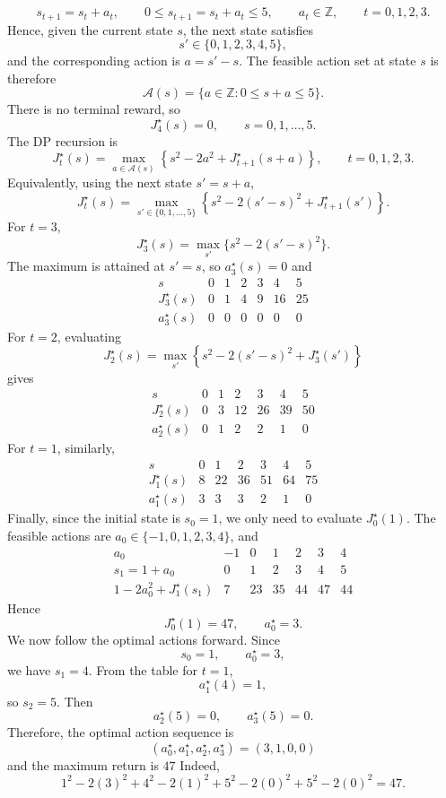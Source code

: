 \documentclass{article}
\begin{document}
\section{}
\[s_{t+1}=s_t+a_t, \qquad
0\leq s_{t+1}=s_t+a_t\leq 5, \qquad
a_t\in\mathbb Z, \qquad t=0,1,2,3.\]
Hence, given the current state $s$, the next state satisfies
\[s'\in\{0,1,2,3,4,5\},\]
and the corresponding action is $a=s'-s$. The feasible action set at state
$s$ is therefore
\[\mathcal A(s)=\{a\in\mathbb Z:0\leq s+a\leq 5\}.\]
There is no terminal reward, so
\[J_4^\star(s)=0, \qquad s=0,1,\ldots,5.\]
The DP recursion is
\[J_t^\star(s)=
\max_{a\in\mathcal A(s)}
\left\{
s^2-2a^2+J_{t+1}^\star(s+a)
\right\},
\qquad t=0,1,2,3.\]
Equivalently, using the next state $s'=s+a$,
\[J_t^\star(s)
=\max_{s'\in\{0,1,\ldots,5\}}
\left\{
s^2-2(s'-s)^2+J_{t+1}^\star(s')
\right\}.\]
For $t=3$,
\[J_3^\star(s)=\max_{s'}\{s^2-2(s'-s)^2\}.\]
The maximum is attained at $s'=s$, so $a_3^\star(s)=0$ and
\[\begin{array}{c|cccccc}
s & 0&1&2&3&4&5\\ \hline
J_3^\star(s)&0&1&4&9&16&25\\
a_3^\star(s)&0&0&0&0&0&0
\end{array}\]
For $t=2$, evaluating
\[J_2^\star(s)=\max_{s'}\left\{s^2-2(s'-s)^2+J_3^\star(s')\right\}\]
gives
\[\begin{array}{c|cccccc}
s & 0&1&2&3&4&5\\ \hline
J_2^\star(s)&0&3&12&26&39&50\\
a_2^\star(s)&0&1&2&2&1&0
\end{array}\]
For $t=1$, similarly,
\[\begin{array}{c|cccccc}
s & 0&1&2&3&4&5\\ \hline
J_1^\star(s)&8&22&36&51&64&75\\
a_1^\star(s)&3&3&3&2&1&0
\end{array}\]
Finally, since the initial state is $s_0=1$, we only need to evaluate
$J_0^\star(1)$. The feasible actions are
$a_0\in\{-1,0,1,2,3,4\}$, and
\[\begin{array}{c|rrrrrr}
a_0&-1&0&1&2&3&4\\ \hline
s_1=1+a_0&0&1&2&3&4&5\\
1-2a_0^2+J_1^\star(s_1)&7&23&35&44&47&44
\end{array}\]
Hence
\[J_0^\star(1)=47, \qquad a_0^\star=3.\]
We now follow the optimal actions forward. Since
\[s_0=1, \qquad a_0^\star=3,\]
we have $s_1=4$. From the table for $t=1$,
\[a_1^\star(4)=1,\]
so $s_2=5$. Then
\[a_2^\star(5)=0, \qquad a_3^\star(5)=0.\]
Therefore, the optimal action sequence is
\[(a_0^\star,a_1^\star,a_2^\star,a_3^\star)=(3,1,0,0)\]
and the maximum return is $47$
Indeed,
\[1^2-2(3)^2+4^2-2(1)^2+5^2-2(0)^2+5^2-2(0)^2=47.\]
\end{document}

